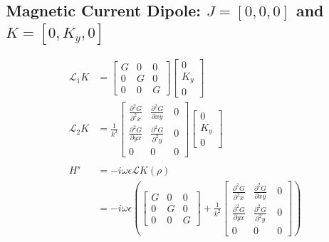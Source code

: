 \documentclass{article}
\newcommand{\0}{\varnothing}
\begin{document}
\subsection{Magnetic Current Dipole: $J = [0,0,0]$ and $K = [0,K_y,0]$}
\begin{minipage}{0.5\textwidth}
\begin{align*}
	\mathcal{L}_1 K &= 
    \left[ \begin{array}{ccc} G & 0 & 0 \\ 
                            0 & G & 0\\ 
                            0 & 0 & G \end{array} \right]
        \left[ \begin{array}{c} 
        0 \\ K_y \\ 0 \end{array} \right]\\
	\mathcal{L}_2 K &= \frac{1}{k^2} \left[ \begin{array}{ccc} \frac{\partial^2 G }{\partial^2 x} & \frac{\partial^2 G }{\partial xy}\ & 0 \\ 
                            \frac{\partial^2 G}{\partial yx} & \frac{\partial^2 G}{\partial^2 y} &0\\ 
                            0 & 0 &0 \end{array} \right]
                                    \left[ \begin{array}{c} 
					        0 \\ K_y \\ 0 \end{array} \right]\\
	\ \\
	H^s &= -i\omega\epsilon \mathcal{L} K (\rho) \\ &= -i\omega\epsilon 
	\left( \left[ \begin{array}{ccc} G & 0 & 0 \\ 
                            0 & G & 0\\ 
                            0 & 0 & G \end{array} \right] + \frac{1}{k^2} \left[ \begin{array}{ccc} \frac{\partial^2 G }{\partial^2 x} & \frac{\partial^2 G }{\partial xy}\ & 0 \\ 
                            \frac{\partial^2 G}{\partial yx} & \frac{\partial^2 G}{\partial^2 y} &0\\ 
                            0 & 0 &0 \end{array} \right] \right)

\end{align*}
\end{minipage}
\end{document}
